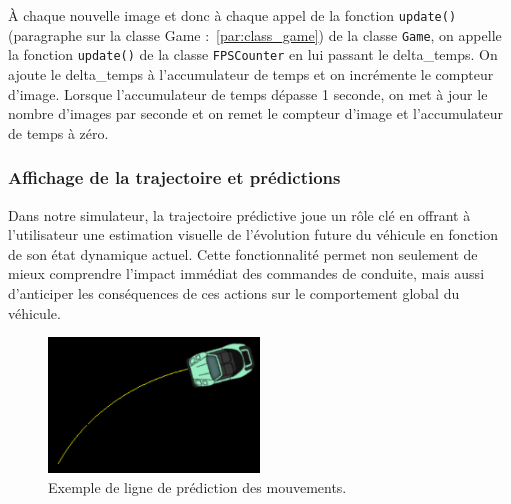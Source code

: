 À chaque nouvelle image et donc à chaque appel de la fonction \texttt{update()} (paragraphe sur la classe Game :~\ref{par:class_game}) de la classe \texttt{Game}, on appelle la fonction \texttt{update()} de la classe \texttt{FPSCounter} en lui passant le \gls{delta_temps}.
On ajoute le \gls{delta_temps} à l'accumulateur de temps et on incrémente le compteur d'image.
Lorsque l'accumulateur de temps dépasse 1 seconde, on met à jour le nombre d'images par seconde et on remet le compteur d'image et l'accumulateur de temps à zéro.

\subsubsection{Affichage de la trajectoire et prédictions}\label{subsubsec:affichage-de-la-trajectoire-et-predictions}
Dans notre simulateur, la trajectoire prédictive joue un rôle clé en offrant à l'utilisateur une estimation visuelle de l'évolution future du véhicule en fonction de son état dynamique actuel.
Cette fonctionnalité permet non seulement de mieux comprendre l'impact immédiat des commandes de conduite, mais aussi d'anticiper les conséquences de ces actions sur le comportement global du véhicule.

\begin{figure}[H]
    \centering
    \includegraphics[width=0.5\textwidth]{resources/example_prediction_line_1}
    \caption{Exemple de ligne de prédiction des mouvements.}
    \label{fig:prediction_line}
\end{figure}

